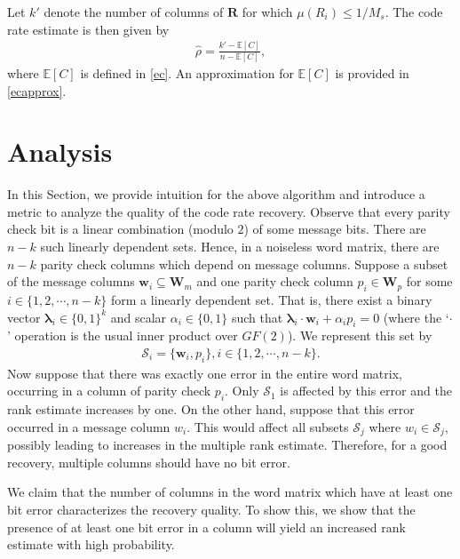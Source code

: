 \documentclass[conference]{IEEEtran}
\begin{document}
\begin{enumerate}
     Let  $k'$ denote the number of columns of $\mathbf{R}$ for which $\mu(R_i) \leq 1/M_s$. 
The code rate estimate is then given by \begin{align}\label{coderateestimate}
        \hat{\rho} = \frac{k' - \mathbb{E}[C]}{n-\mathbb{E}[C]},
    \end{align}
    where $\mathbb{E}[C]$ is defined in \eqref{ec}.
An approximation for $\mathbb{E}[C]$ is provided in \eqref{ecapprox}.


\end{enumerate}

\section{Analysis}
In this Section, we provide intuition for the above algorithm and introduce a metric to analyze the quality of the code rate recovery. 
Observe that every parity check bit is a linear combination (modulo $2$) of some message bits. There are $n-k$ such linearly dependent sets. Hence, in a noiseless word matrix, there are $n-k$ parity check columns which depend on message columns. Suppose a subset of the message columns $\mathbf{w}_i \subseteq \mathbf{W}_m$ and one parity check column $p_i \in \mathbf{W}_p$ for some $i \in \{1, 2, \cdots,  n-k\}$ form a linearly dependent set. That is, there exist a binary vector $\mathbf{\lambda}_i \in \{0, 1\}^{k}$ and scalar $\alpha_i \in \{0,1\}$ such that $\mathbf{\lambda}_i \cdot \mathbf{w}_i + \alpha_i p_i = 0$ (where the `$\cdot$' operation is the usual inner product over $GF(2)$).
We represent this set by
\begin{align*}
    \mathcal{S}_i = \{\mathbf{w}_i, p_i\}, i \in \{1, 2, \cdots,  n-k\}.
\end{align*}
Now suppose that there was exactly one error in the entire word matrix, occurring in a column of parity check $p_i$. Only $\mathcal{S}_1$ is affected by this error and the rank estimate increases by one. On the other hand, suppose that this error occurred in a message column $w_i$. This would affect all subsets $\mathcal{S}_j$ where $w_i \in \mathcal{S}_j$, possibly leading to increases in the multiple rank estimate. Therefore, for a good recovery, multiple columns should have no bit error.

We claim that the number of columns in the word matrix which have at least one bit error characterizes the recovery quality. To show this, we show that the presence of at least one bit error in a column will yield an increased rank estimate with high probability.
\end{document}
